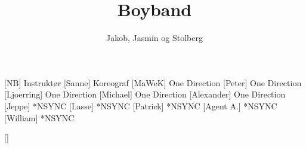\documentclass[a4paper,11pt]{article}
\title{Boyband}
\author{Jakob, Jasmin og Stolberg}
\begin{document}
\maketitle

\begin{roles}
[NB] Instruktør
[Sanne] Koreograf
[MaWeK] One Direction
[Peter] One Direction
[Ljoerring] One Direction
[Michael] One Direction
[Alexander] One Direction
[Jeppe] *NSYNC
[Lasse] *NSYNC
[Patrick] *NSYNC
[Agent A.] *NSYNC
[William] *NSYNC
\end{roles}

\begin{props}
[]
\end{props}
\end{document}
